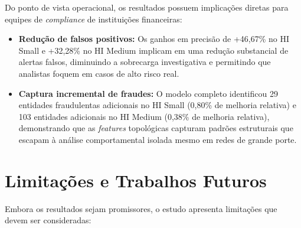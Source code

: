 \documentclass[a4paper,12pt,oneside,onecolumn,final,fleqn]{repUERJ}
\begin{document}
Do ponto de vista operacional, os resultados possuem implicações diretas para equipes de \textit{compliance} de instituições financeiras:

\begin{itemize}
  \item \textbf{Redução de falsos positivos:} Os ganhos em precisão de +46,67\% no HI Small e +32,28\% no HI Medium implicam em uma redução substancial de alertas falsos, diminuindo a sobrecarga investigativa e permitindo que analistas foquem em casos de alto risco real.
    
    \item \textbf{Captura incremental de fraudes:} O modelo completo identificou 29 entidades fraudulentas adicionais no HI Small (0,80\% de melhoria relativa) e 103 entidades adicionais no HI Medium (0,38\% de melhoria relativa), demonstrando que as \textit{features} topológicas capturam padrões estruturais que escapam à análise comportamental isolada mesmo em redes de grande porte.
\end{itemize}

\section{Limitações e Trabalhos Futuros}

Embora os resultados sejam promissores, o estudo apresenta limitações que devem ser consideradas:
\end{document}
